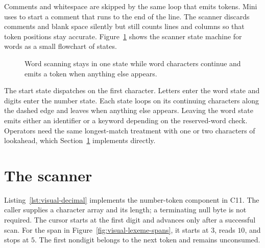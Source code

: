 Comments and whitespace are skipped by the same loop that emits tokens.
Mini uses \code{\#} to start a comment that runs to the end of the line.
The scanner discards comments and blank space silently but still counts lines and columns so that token positions stay accurate.
Figure~\ref{fig:ch03-word-dfa} shows the scanner state machine for words as a small flowchart of states.
\begin{figure}
\centering
{}
\caption{Word scanning stays in one state while word characters continue and emits a token when anything else appears.}
\label{fig:ch03-word-dfa}
\end{figure}
The start state dispatches on the first character.
Letters enter the word state and digits enter the number state.
Each state loops on its continuing characters along the dashed edge and leaves when anything else appears.
Leaving the word state emits either an identifier or a keyword depending on the reserved-word check.
Operators need the same longest-match treatment with one or two characters of lookahead, which Section~\ref{sec:ch03-scanner} implements directly.

\section{The scanner}
\label{sec:ch03-scanner}

Listing~\ref{lst:visual-decimal} implements the number-token component in C11.
The caller supplies a character array and its length; a terminating null byte is not required.
The cursor starts at the first digit and advances only after a successful scan.
For the span in Figure~\ref{fig:visual-lexeme-spans}, it starts at $3$, reads $10$, and stops at $5$.
The first nondigit belongs to the next token and remains unconsumed.

